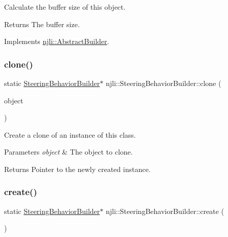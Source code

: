 Calculate the buffer size of this object.

\begin{DoxyReturn}{Returns}
The buffer size. 
\end{DoxyReturn}


Implements \mbox{\hyperlink{classnjli_1_1_abstract_builder_aa1d220053e182c37b31b427499c6eacf}{njli\+::\+Abstract\+Builder}}.

\mbox{\label{classnjli_1_1_steering_behavior_builder_aa304bf81d3f542c2c1d70361f6626ded}} 
\subsubsection{\texorpdfstring{clone()}{clone()}}
{\footnotesize\ttfamily static \mbox{\hyperlink{classnjli_1_1_steering_behavior_builder}{Steering\+Behavior\+Builder}}$\ast$ njli\+::\+Steering\+Behavior\+Builder\+::clone (\begin{DoxyParamCaption}\item[{const \mbox{\hyperlink{classnjli_1_1_steering_behavior_builder}{Steering\+Behavior\+Builder}} \&}]{object }\end{DoxyParamCaption})\hspace{0.3cm}{\ttfamily [static]}}

Create a clone of an instance of this class.


\begin{DoxyParams}{Parameters}
{\em object} & The object to clone.\\
\hline
\end{DoxyParams}
\begin{DoxyReturn}{Returns}
Pointer to the newly created instance. 
\end{DoxyReturn}
\mbox{\label{classnjli_1_1_steering_behavior_builder_aa53852bf591603694a821a489f47887c}} 
\subsubsection{\texorpdfstring{create()}{create()}}
{\footnotesize\ttfamily static \mbox{\hyperlink{classnjli_1_1_steering_behavior_builder}{Steering\+Behavior\+Builder}}$\ast$ njli\+::\+Steering\+Behavior\+Builder\+::create (\begin{DoxyParamCaption}{ }\end{DoxyParamCaption})\hspace{0.3cm}{\ttfamily [static]}}

